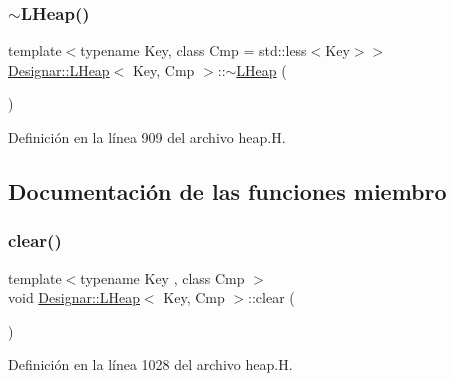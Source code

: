 \mbox{\label{class_designar_1_1_l_heap_ae8222af1e06c39acc9ae21589c70b874}} 
\subsubsection{\texorpdfstring{$\sim$\+L\+Heap()}{~LHeap()}}
{\footnotesize\ttfamily template$<$typename Key, class Cmp = std\+::less$<$\+Key$>$$>$ \\
\hyperlink{class_designar_1_1_l_heap}{Designar\+::\+L\+Heap}$<$ Key, Cmp $>$\+::$\sim$\hyperlink{class_designar_1_1_l_heap}{L\+Heap} (\begin{DoxyParamCaption}{ }\end{DoxyParamCaption})\hspace{0.3cm}{\ttfamily [inline]}}



Definición en la línea 909 del archivo heap.\+H.



\subsection{Documentación de las funciones miembro}
\mbox{\label{class_designar_1_1_l_heap_a19ea9506d108cdb3662f936e21483c1d}} 
\subsubsection{\texorpdfstring{clear()}{clear()}}
{\footnotesize\ttfamily template$<$typename Key , class Cmp $>$ \\
void \hyperlink{class_designar_1_1_l_heap}{Designar\+::\+L\+Heap}$<$ Key, Cmp $>$\+::clear (\begin{DoxyParamCaption}{ }\end{DoxyParamCaption})}



Definición en la línea 1028 del archivo heap.\+H.

\mbox{\label{class_designar_1_1_l_heap_ae8fe8b715ed64d66763a20e409b76bd3}} 

